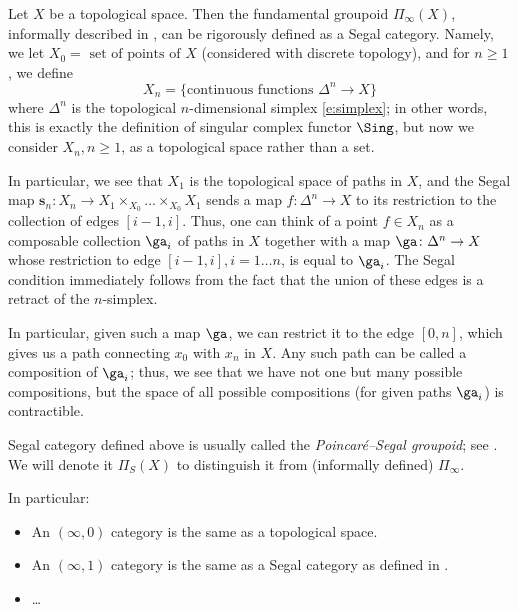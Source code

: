 \begin{example}\label{x:poincare-segal}
  Let $X$ be a topological space. Then the fundamental groupoid
  $\Pi_{\infty}(X)$, informally described in ,
  can be rigorously defined as a Segal category. Namely, we let
  $X_0=\text{ set of points of $X$}$ (considered with discrete topology),
  and for $n\ge 1$, we define
  $$
    X_n= \{\text{continuous functions $\Delta^n\to X$}\}
  $$
  where $\Delta^n$ is the topological $n$-dimensional simplex \eqref{e:simplex};
  in other words, this is exactly the definition of singular complex functor
  $\Sing$, but now we consider $X_n, n\ge 1$, as a topological space rather
  than a set.

  In particular, we see that $X_1$ is the topological space of paths in $X$,
  and the Segal map $\mathbf{s}_n\colon X_n \to X_1\times_{X_0}\dots\times_{X_0}
  X_1$ sends a map $f\colon \Delta^n\to X$ to its restriction to the collection
  of edges $[i-1, i]$. Thus, one can think of a point $f\in X_n$ as a composable
  collection $\ga_i$ of paths in $X$ together with a map $\ga \colon
  \Delta^n\to X$ whose restriction to edge $[i-1, i], i=1\dots n$, is equal to
  $\ga_i$. The Segal condition immediately follows from the fact that the union of
  these edges is a retract of the $n$-simplex.

  In particular, given such a map $\ga$, we can restrict it to the edge $[0,n]$,
  which gives us a path connecting $x_0$ with $x_n$ in $X$. Any such path can be
  called a composition of $\ga_i$; thus, we see that we have not one but many
  possible compositions, but the space of all possible compositions (for given
  paths $\ga_i$) is contractible.

  Segal category defined above is usually called the \emph{Poincar\'e--Segal
  groupoid}; see \cite[Sections 15.2, 15.3]{simpson}. We will denote it
  $\Pi_S(X)$ to distinguish it from (informally defined) $\Pi_{\infty}$.

\end{example}


In particular:
\begin{itemize}
  \item An $(\infty, 0)$ category is the same as a topological space.
  \item An $(\infty, 1)$ category is the same as a Segal category as defined
    in .
  \item \dots
\end{itemize}

